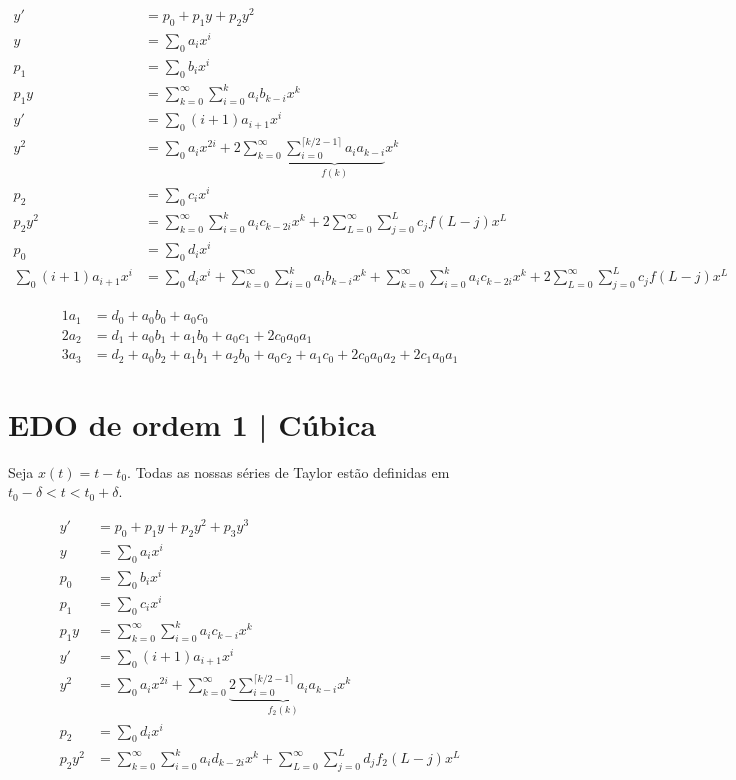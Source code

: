 \documentclass[11pt]{article}
\begin{document}
\begin{align}
 y' &= p_0 +  p_1 y + p_2 y^2 \\
 y &= \sum_0 a_i x^i \\
 p_1 &= \sum_0 b_i x^i \\
 p_1 y &= \sum_{k = 0}^{\infty} \sum_{i = 0}^k a_i b_{k - i} x^k \\
 y' &= \sum_0 (i + 1) a_{i + 1} x^i \\
 y^2 &= \sum_0 a_i x^{2i} + 2 \sum_{k = 0}^{\infty} \underbrace{\sum_{i = 0}^{\lceil k/2 - 1 \rceil} a_i a_{k - i}}_{f(k)} x^k \\
  p_2 &= \sum_0 c_i x^i \\
 p_2 y^2 &= \sum_{k = 0}^{\infty} \sum_{i = 0}^k a_i c_{k - 2i} x^k + 2 \sum_{L = 0}^{\infty}  \sum_{j = 0}^L c_j f(L-j) x^L \\
 p_0 &= \sum_0 d_i x^i \\
 \sum_0 (i + 1) a_{i + 1} x^i &= \sum_0 d_i x^i + \sum_{k = 0}^{\infty} \sum_{i = 0}^k a_i b_{k - i} x^k + \sum_{k = 0}^{\infty} \sum_{i = 0}^k a_i c_{k - 2i} x^k + 2 \sum_{L = 0}^{\infty}  \sum_{j = 0}^L c_j f(L-j) x^L
 \end{align}

 \begin{align}
 1a_1 &= d_0 + a_0 b_0 + a_0 c_0 \\
 2 a_2 &= d_1 + a_0 b_1 + a_1 b_0 + a_0 c_1 + 2 c_0 a_0 a_1 \\
 3 a_3 &= d_2 + a_0 b_2 + a_1 b_1 + a_2 b_0 + a_0 c_2 + a_1 c_0 + 2 c_0 a_0 a_2 + 2 c_1 a_0 a_1
 \end{align}

\section{EDO de ordem 1 | C\'ubica}

Seja $x(t) = t - t_0$. Todas as nossas s\'eries de Taylor est\~ao definidas em $t_0 - \delta < t < t_0 + \delta$.

\begin{align}
 y' &= p_0 +  p_1 y + p_2 y^2 + p_3 y^3 \\
 y &= \sum_0 a_i x^i \\
 p_0 &= \sum_0 b_i x^i \\
 p_1 &= \sum_0 c_i x^i \\
 p_1 y &= \sum_{k = 0}^{\infty} \sum_{i = 0}^k a_i c_{k - i} x^k \\
 y' &= \sum_0 (i + 1) a_{i + 1} x^i \\
 y^2 &= \sum_0 a_i x^{2i} + \sum_{k = 0}^{\infty} \underbrace{2 \sum_{i = 0}^{\lceil k/2 - 1 \rceil} a_i a_{k - i}}_{f_2(k)} x^k \\
  p_2 &= \sum_0 d_i x^i \\
 p_2 y^2 &= \sum_{k = 0}^{\infty} \sum_{i = 0}^k a_i d_{k - 2i} x^k + \sum_{L = 0}^{\infty}  \sum_{j = 0}^L d_j f_2(L-j) x^L
\end{align}
\end{document}
